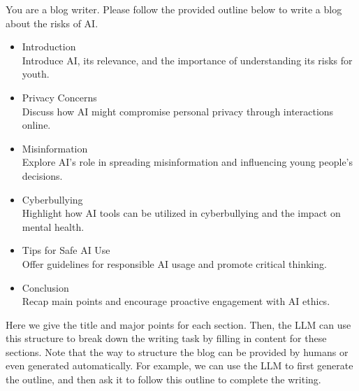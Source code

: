 \vspace{0.5em}
\begin{tcolorbox}

\begingroup
\setlength{\leftskip}{2em}
\setlength{\rightskip}{2em}

You are a blog writer. Please follow the provided outline below to write a blog about the risks of AI.

\vspace{0.5em}

\begin{itemize}
\item Introduction\\
Introduce AI, its relevance, and the importance of understanding its risks for youth.
\item Privacy Concerns\\
Discuss how AI might compromise personal privacy through interactions online.
\item Misinformation\\
Explore AI's role in spreading misinformation and influencing young people's decisions.
\item Cyberbullying\\
Highlight how AI tools can be utilized in cyberbullying and the impact on mental health.
\item Tips for Safe AI Use\\
Offer guidelines for responsible AI usage and promote critical thinking.
\item Conclusion\\
Recap main points and encourage proactive engagement with AI ethics.
\end{itemize}

\vspace{0.5em}

\underline{\hspace{2em}}

\endgroup

\end{tcolorbox}
\vspace{0.5em}

\noindent Here we give the title and major points for each section. Then, the LLM can use this structure to break down the writing task by filling in content for these sections. Note that the way to structure the blog can be provided by humans or even generated automatically. For example, we can use the LLM to first generate the outline, and then ask it to follow this outline to complete the writing.

